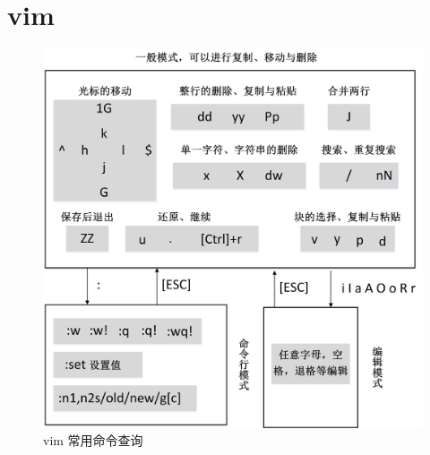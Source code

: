 \section{vim}

\setcounter{figure}{0}

\begin{figure}[h]
\centering
\includegraphics[width=\textwidth]{pic/vim&control.jpg}
\caption{vim 常用命令查询}
\end{figure}

